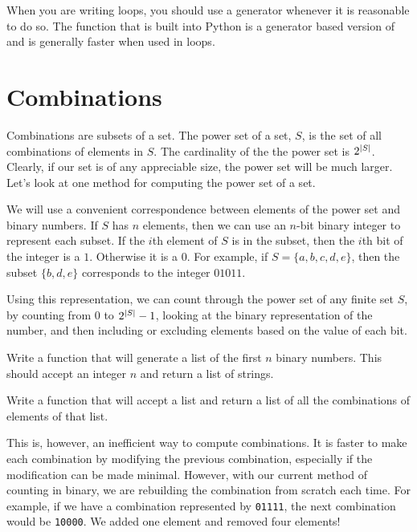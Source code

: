 When you are writing  loops, you should use a generator whenever it is reasonable to do so.
The  function that is built into Python is a generator based version of  and is generally faster when used in  loops.

\section*{Combinations}
Combinations are subsets of a set.  The power set of a set, $S$, is the set of all combinations
of elements in $S$.  The cardinality of the the power set is $2^{\left\lvert S\right\rvert}$.  Clearly, if our
set is of any appreciable size, the power set will be much larger.  Let's look at one method for
computing the power set of a set.

We will use a convenient correspondence between elements of the power set and binary numbers.
If $S$ has $n$ elements, then we can use an $n$-bit binary integer to represent each subset.
If the $i$th element of $S$ is in the subset, then the $i$th bit of the integer is a $1$.
Otherwise it is a $0$.
For example, if $S = \{a,b,c,d,e\}$, then the subset $\{b,d,e\}$ corresponds to the integer $01011$.

Using this representation, we can count through the power set of any finite set $S$, by counting from 0 to $2^{\left\lvert S\right\rvert}-1$, looking at the binary representation of the number, and then including or excluding elements based on the value of each bit.

\begin{problem}
Write a function that will generate a list of the first $n$ binary numbers.  This should accept an integer $n$ and return a list of strings.
\end{problem}

\begin{problem}
Write a function that will accept a list and return a list of all the combinations
of elements of that list.
\end{problem}

This is, however, an inefficient way to compute combinations.
It is faster to make each combination by modifying the previous combination, especially if the modification can be made minimal.
However, with
our current method of counting in binary, we are rebuilding the combination from scratch
each time.  For example, if we have a combination represented by \texttt{01111}, the next
combination would be \texttt{10000}.  We added one element and removed four elements!

